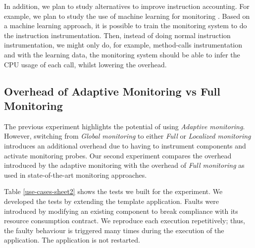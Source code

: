In addition, we plan to study alternatives to improve instruction accounting. %
For example, we plan to study the use of machine learning for monitoring \cite{tesauro2006hybrid}. Based on a machine learning approach, it is possible to train the monitoring system to do the instruction instrumentation. Then, instead of doing normal instruction instrumentation, we might only do, for example, method-calls instrumentation and with the learning data, the monitoring system should be able to infer the CPU usage of each call, whilst lowering the overhead.

\subsection{Overhead of Adaptive Monitoring vs Full Monitoring\label{sec:adaptive-vs-full}}
The previous experiment highlights the potential of using \emph{Adaptive monitoring}. However, switching from \emph{Global monitoring} to either \emph{Full} or \emph{Localized monitoring} introduces an additional overhead due to having to instrument components and activate monitoring probes.
Our second experiment compares the overhead introduced by the adaptive monitoring with the overhead of \emph{Full monitoring} as used in state-of-the-art monitoring approaches. 

Table \ref{use-cases-sheet2} shows the tests we built for the experiment.
We developed the tests by extending the template application. Faults were introduced by modifying an existing component to break compliance with its resource consumption contract.
We reproduce each execution repetitively; thus, the faulty behaviour is triggered many times during the execution of the application. The application is not restarted.

